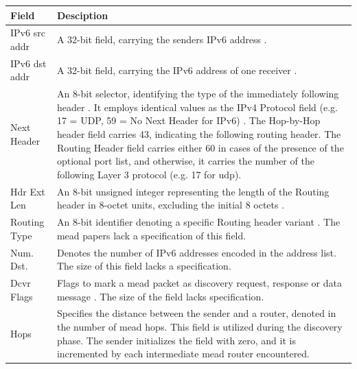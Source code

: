 \bgroup
\begin{table}[!htbp]
\centering
\def\arraystretch{1.35}%
\setlength{\tabcolsep}{1.2em}
\begin{tabularx}{\textwidth}{lX}
\toprule
\textbf{Field}& \textbf{Desciption} \\
\midrule
IPv6 src addr & A 32-bit field, carrying the senders IPv6 address
                \cite{meadcast2}.\\
IPv6 dst addr & A 32-bit field, carrying the IPv6 address of one receiver
                \cite{meadcast2}.\\ \midrule
Next Header   & An 8-bit selector, identifying the type of the immediately
                following header \cite{rfc8200_ipv6_hdr}.
                It employs identical values as the IPv4 Protocol field (e.g. 17
                = UDP, 59 = No Next Header for IPv6) \cite{iana_prot_nums}.
                The Hop-by-Hop header field carries 43, indicating the
                following routing header.
                The Routing Header field carries either 60 in cases of the
                presence of the optional port list, and otherwise, it carries 
                the number of the following Layer 3 protocol (e.g. 17 for
                \gls{udp}). \\
Hdr Ext Len   & An 8-bit unsigned integer representing the length of the
                Routing header in 8-octet units, excluding the initial 8
                octets \cite{rfc8200_ipv6_hdr}. \\
Routing Type  & An 8-bit identifier denoting a specific Routing header variant
                \cite{rfc8200_ipv6_hdr}.
                The \gls{mead} papers \cite{meadcast1,meadcast2} lack a
                specification of this field.\\
Num. Dst.     & Denotes the number of IPv6 addresses encoded in the address
                list.
                The size of this field lacks a specification.\\
Dcvr Flags    & Flags to mark a \gls{mead} packet as discovery request,
                response or data message \cite{meadcast2}.
                The size of the field lacks specification. \\
Hops          & Specifies the distance between the sender and a router, denoted
                in the number of \gls{mead} hops.
                This field is utilized during the discovery phase. The sender
                initializes the field with zero, and it is incremented by each
                intermediate \gls{mead} router encountered.

\end{tabularx}
\end{table}
